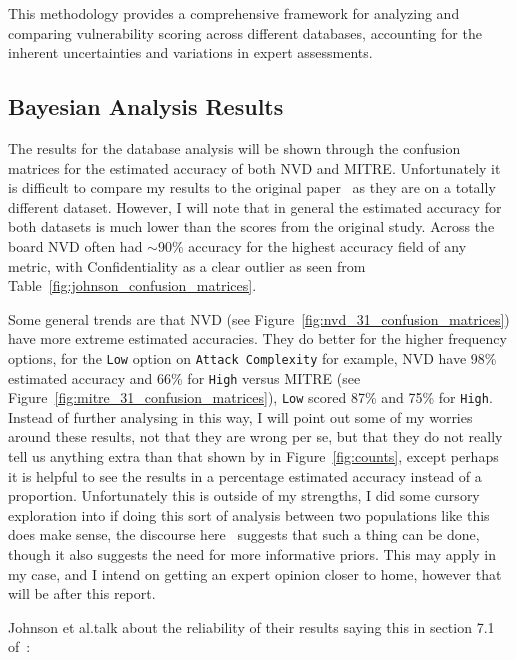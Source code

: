 \documentclass[12pt]{article}
\begin{document}
This methodology provides a comprehensive framework for analyzing and comparing vulnerability
scoring across different databases, accounting for the inherent uncertainties and variations in
expert assessments.


\subsection{Bayesian Analysis Results}

The results for the database analysis will be shown through the confusion matrices for the estimated
accuracy of both NVD and MITRE. Unfortunately it is difficult to compare my results to the original
paper~\cite{bayes} as they are on a totally different dataset. However, I will note that in general the estimated
accuracy for both datasets is much lower than the scores from the original study. Across the board NVD
often had $\sim$90\% accuracy for the highest accuracy field of any metric, with Confidentiality as
a clear outlier as seen from Table~\ref{fig:johnson_confusion_matrices}.

Some general trends are that NVD (see Figure~\ref{fig:nvd_31_confusion_matrices}) have more extreme
estimated accuracies. They do better for the higher frequency options, for the \texttt{Low} option
on \texttt{Attack Complexity} for example, NVD have 98\% estimated accuracy and 66\% for
\texttt{High} versus MITRE (see Figure~\ref{fig:mitre_31_confusion_matrices}), \texttt{Low} scored
87\% and 75\% for \texttt{High}. Instead of further analysing in this way, I will point out some of
my worries around these results, not that they are wrong per se, but that they do not really tell us
anything extra than that shown by in Figure~\ref{fig:counts}, except perhaps it is helpful to see
the results in a percentage estimated accuracy instead of a proportion. Unfortunately this is
outside of my strengths, I did some cursory exploration into if doing this sort of analysis
between two populations like this does make sense, the discourse here~\cite{stat_modeling} suggests
that such a thing can be done, though it also suggests the need for more informative priors. This
may apply in my case, and I intend on getting an expert opinion closer to home, however that will be
after this report.

Johnson et al.\@ talk about the reliability of their results saying this in section 7.1 of~\cite{bayes}:\\ \\
\end{document}
